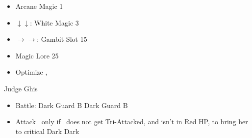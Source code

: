\begin{liscense}
\begin{itemize}
	\begin{itemize}
		\item Arcane Magic 1
	\end{itemize}
	\ashef \leftb
	\begin{itemize}
		\item $\downarrow\downarrow$: White Magic 3
	\end{itemize}
	\penelof \leftb
	\begin{itemize}
		\item $\rightarrow\rightarrow$: Gambit Slot 15
	\end{itemize}
	\ashef \rightb
	\begin{itemize}
		\item Magic Lore 25
	\end{itemize}
	\penelof \leftb
	\begin{itemize}
	\end{itemize}
\end{itemize}
\end{liscense}
\begin{equip}
	\begin{itemize}
		\item Optimize \ashe, \penelo
	\end{itemize}
\end{equip}
\begin{battle}{Judge Ghis}
	\begin{itemize}
		\penelof Dark \penelo
		\vaanf Reflect \ashe
		\ashef Heal \vaan
		\penelof Reflect \penelo
		\vaanf Reflect \vaan
		\item Battle:
		      \vaanf Dark Guard B
		      \penelof Dark Guard B
		      \item \leader{\penelo}
		      \ashef Attack \penelo\ only if \penelo\ does not get Tri-Attacked, and isn't in Red HP, to bring her to critical
		      \vaanf Dark \penelo
		      \penelof Dark \penelo
	\end{itemize}
\end{battle}